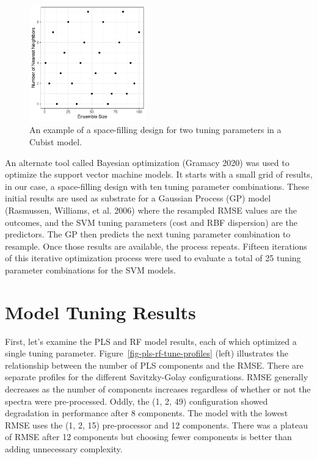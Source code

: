 \documentclass[
  letterpaper,
  DIV=11,
  numbers=noendperiod]{scrartcl}
\begin{document}
\begin{figure}[t!]

{\centering \includegraphics[width=0.45\textwidth,height=\textheight]{figures/fig-sfd-1.pdf}

}

\caption{\label{fig-sfd}An example of a space-filling design for two
tuning parameters in a Cubist model.}

\end{figure}

An alternate tool called Bayesian optimization (Gramacy 2020) was used
to optimize the support vector machine models. It starts with a small
grid of results, in our case, a space-filling design with ten tuning
parameter combinations. These initial results are used as substrate for
a Gaussian Process (GP) model (Rasmussen, Williams, et al. 2006) where
the resampled RMSE values are the outcomes, and the SVM tuning
parameters (cost and RBF dispersion) are the predictors. The GP then
predicts the next tuning parameter combination to resample. Once those
results are available, the process repeats. Fifteen iterations of this
iterative optimization process were used to evaluate a total of 25
tuning parameter combinations for the SVM models.

\hypertarget{model-tuning-results}{%
\section{Model Tuning Results}\label{model-tuning-results}}

First, let's examine the PLS and RF model results, each of which
optimized a single tuning parameter.
Figure~\ref{fig-pls-rf-tune-profiles} (left) illustrates the
relationship between the number of PLS components and the RMSE. There
are separate profiles for the different Savitzky-Golay configurations.
RMSE generally decreases as the number of components increases
regardless of whether or not the spectra were pre-processed. Oddly, the
(1, 2, 49) configuration showed degradation in performance after 8
components. The model with the lowest RMSE uses the (1, 2, 15)
pre-processor and 12 components. There was a plateau of RMSE after 12
components but choosing fewer components is better than adding
unnecessary complexity.
\end{document}
